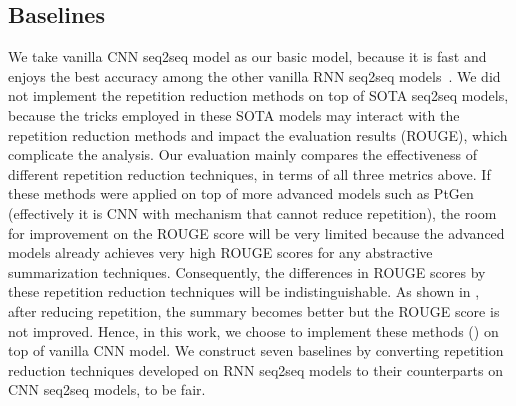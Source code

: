 \subsection{Baselines}
We take vanilla CNN seq2seq model as our basic model,
because it is fast and enjoys the best accuracy among
the other vanilla RNN seq2seq models~\cite{bai2018empirical,gehring2017convs2s}.
We did not implement the repetition reduction methods 
on top of SOTA seq2seq models,
because the tricks employed in these SOTA models may 
interact with the repetition reduction methods 
and impact the evaluation results (ROUGE), which complicate the analysis.
Our evaluation mainly compares the effectiveness of different repetition reduction techniques,
in terms of all three metrics above. If these methods were
applied on top of more advanced models such as PtGen (effectively it is CNN with mechanism that cannot reduce repetition), 
the room for improvement on the ROUGE score will be
very limited because the advanced models already achieves very high ROUGE scores for any abstractive
summarization techniques. 
Consequently, the differences in ROUGE scores by these repetition reduction techniques will be
indistinguishable. 
As shown in , after reducing repetition, the summary becomes better
but the ROUGE score is not improved. 
Hence, in this work, we choose to implement these methods () on top of vanilla CNN model.
We construct seven baselines  
by converting
repetition reduction techniques developed on RNN seq2seq models to their
counterparts on CNN seq2seq models,
to be fair.

